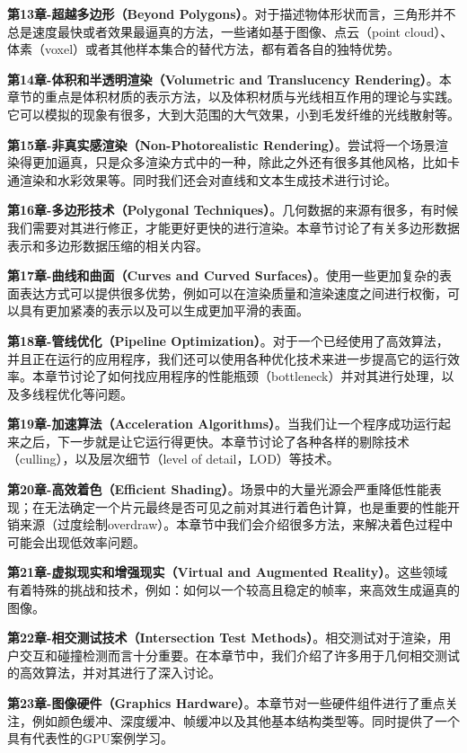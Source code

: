 \documentclass[
  paper=a4,
  ,captions=tableheading
]{scrartcl}
\begin{document}
\textbf{第13章-超越多边形（Beyond
Polygons）}。对于描述物体形状而言，三角形并不总是速度最快或者效果最逼真的方法，一些诸如基于图像、点云（point
cloud）、体素（voxel）或者其他样本集合的替代方法，都有着各自的独特优势。

\textbf{第14章-体积和半透明渲染（Volumetric and Translucency
Rendering）}。本章节的重点是体积材质的表示方法，以及体积材质与光线相互作用的理论与实践。它可以模拟的现象有很多，大到大范围的大气效果，小到毛发纤维的光线散射等。

\textbf{第15章-非真实感渲染（Non-Photorealistic
Rendering）}。尝试将一个场景渲染得更加逼真，只是众多渲染方式中的一种，除此之外还有很多其他风格，比如卡通渲染和水彩效果等。同时我们还会对直线和文本生成技术进行讨论。

\textbf{第16章-多边形技术（Polygonal
Techniques）}。几何数据的来源有很多，有时候我们需要对其进行修正，才能更好更快的进行渲染。本章节讨论了有关多边形数据表示和多边形数据压缩的相关内容。

\textbf{第17章-曲线和曲面（Curves and Curved
Surfaces）}。使用一些更加复杂的表面表达方式可以提供很多优势，例如可以在渲染质量和渲染速度之间进行权衡，可以具有更加紧凑的表示以及可以生成更加平滑的表面。

\textbf{第18章-管线优化（Pipeline
Optimization）}。对于一个已经使用了高效算法，并且正在运行的应用程序，我们还可以使用各种优化技术来进一步提高它的运行效率。本章节讨论了如何找应用程序的性能瓶颈（bottleneck）并对其进行处理，以及多线程优化等问题。

\textbf{第19章-加速算法（Acceleration
Algorithms）}。当我们让一个程序成功运行起来之后，下一步就是让它运行得更快。本章节讨论了各种各样的剔除技术（culling），以及层次细节（level
of detail，LOD）等技术。

\textbf{第20章-高效着色（Efficient
Shading）}。场景中的大量光源会严重降低性能表现；在无法确定一个片元最终是否可见之前对其进行着色计算，也是重要的性能开销来源（过度绘制overdraw）。本章节中我们会介绍很多方法，来解决着色过程中可能会出现低效率问题。

\textbf{第21章-虚拟现实和增强现实（Virtual and Augmented
Reality）}。这些领域有着特殊的挑战和技术，例如：如何以一个较高且稳定的帧率，来高效生成逼真的图像。

\textbf{第22章-相交测试技术（Intersection Test
Methods）}。相交测试对于渲染，用户交互和碰撞检测而言十分重要。在本章节中，我们介绍了许多用于几何相交测试的高效算法，并对其进行了深入讨论。

\textbf{第23章-图像硬件（Graphics
Hardware）}。本章节对一些硬件组件进行了重点关注，例如颜色缓冲、深度缓冲、帧缓冲以及其他基本结构类型等。同时提供了一个具有代表性的GPU案例学习。
\end{document}
